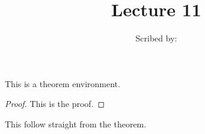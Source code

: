 \documentclass{article}
\begin{document}
  \title{Lecture 11}
  \author{Scribed by: }
  \maketitle

  \begin{theorem}
    This is a theorem environment.
  \end{theorem}
  \begin{proof}
    This is the proof.
  \end{proof}

  \begin{corollary}
    This follow straight from the theorem.
  \end{corollary}
\end{document}
